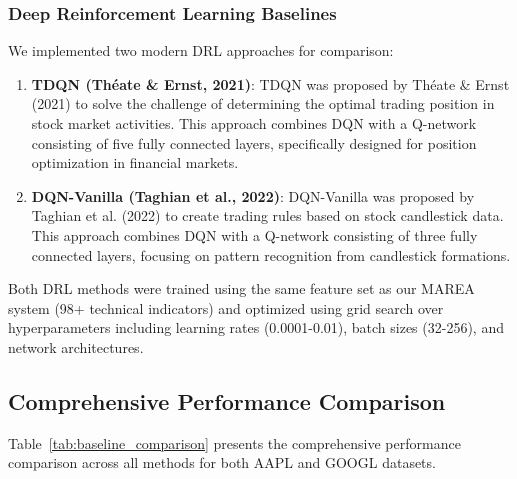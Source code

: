 \documentclass[10pt,twocolumn]{article}
\begin{document}
\subsubsection{Deep Reinforcement Learning Baselines}

We implemented two modern DRL approaches for comparison:

\begin{enumerate}[itemsep=1pt]
\item \textbf{TDQN (Théate \& Ernst, 2021)}: TDQN was proposed by Théate \& Ernst (2021) to solve the challenge of determining the optimal trading position in stock market activities. This approach combines DQN with a Q-network consisting of five fully connected layers, specifically designed for position optimization in financial markets.
\item \textbf{DQN-Vanilla (Taghian et al., 2022)}: DQN-Vanilla was proposed by Taghian et al. (2022) to create trading rules based on stock candlestick data. This approach combines DQN with a Q-network consisting of three fully connected layers, focusing on pattern recognition from candlestick formations.
\end{enumerate}

Both DRL methods were trained using the same feature set as our MAREA system (98+ technical indicators) and optimized using grid search over hyperparameters including learning rates (0.0001-0.01), batch sizes (32-256), and network architectures.

\subsection{Comprehensive Performance Comparison}

Table~\ref{tab:baseline_comparison} presents the comprehensive performance comparison across all methods for both AAPL and GOOGL datasets.
\end{document}
